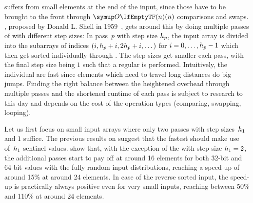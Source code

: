 \subsection{\texorpdfstring{\ShS{}}{ShellSort}}
\label{subsec:tasklet:shell}


\IS{} suffers from small elements at the end of the input, since those have to be brought to the front through \(\bigoh{n}\) comparisons and swaps.
\ShS{}, proposed by Donald L. Shell in 1959~\cite{Shell1959AHS}, gets around this by doing multiple passes of \IS{} with different step sizes:
In pass~\(p\) with step size \(h_p\), the input array is divided into the subarrays of indices \((i, h_p + i, 2 h_p + i, \dots)\) for \(i = 0, \dots, h_p - 1\) which then get sorted individually through \IS{}.
The step sizes get smaller each pass, with the final step size being \(1\) such that a regular \IS{} is performed.
Intuitively, the individual \IS*{} are fast since elements which need to travel long distances do big jumps.
Finding the right balance between the heightened overhead through multiple \IS{} passes and the shortened runtime of each \IS{} pass is subject to research to this day \cite{skean2023optimization,lee2021empirically} and depends on the cost of the operation types (comparing, swapping, looping).

Let us first focus on small input arrays where only two passes with step sizes~\(h_1\) and \(1\) suffice.
The previous results on \IS{} suggest that the fastest \ShS{} should make use of~\(h_1\) sentinel values.
 show that, with the exception of the \ShS{} with step size \(h_1 = 2\), the additional passes start to pay off at around 16 elements for both 32-bit and 64-bit values with the fully random input distributions, reaching a speed-up of around 15\% at around 24 elements.
In case of the reverse sorted input, the speed-up is practically always positive even for very small inputs, reaching between 50\% and 110\% at around 24 elements.

